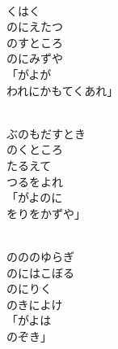 \documentclass[10pt,b5j]{tarticle} %
\begin{document}
\vspace{1.5em} %
\newcommand{\linespace}{0.5em} %
\newcommand{\blocksize}{0.5\hsize} %
\newcommand{\itemmargin}{6em} %
\begin{enumerate} %
    \setlength{\itemindent}{\itemmargin} %
    \begin{minipage}[c]{\blocksize}
    
        \vspace{\linespace}
        \item~\\
        くはく\\
        のにえたつ\\
        のすところ\\
        のにみずや\\
        「がよが\\
        われにかもてくあれ」
        
        \vspace{\linespace}
        \item~\\
        ぶのもだすとき\\
        のくところ\\
        たるえて\\
        つるをよれ\\
        「がよのに\\
        をりをかずや」
        
        \vspace{\linespace}
        \item~\\
        のののゆらぎ\\
        のにはこぼる\\
        のにりく\\
        のきによけ\\
        「がよは\\
        のぞき」
        

\end{minipage}
\end{enumerate}
\end{document}
